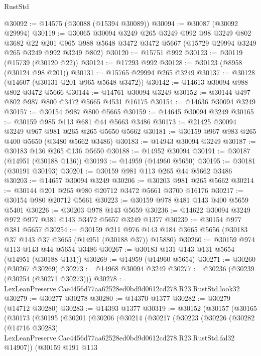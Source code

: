 \begin{lexlean}{RustStd}
\begin{coremodule}
@30092 := @14575 (@30088 (@15394 @30089))
@30094 := @30087 (@30092 @29994)
@30119 := @30065
    @30094
    @3249
    @265
    @3249
    @992
    @98
    @3249
    @802
    @3682
    @22
    @201
    @965
    @988
    @5648
    @3472
    @3472
    @5667
    (@15729 @29994 @3249 @265 @3249 @992 @3249 @802)
@30120 := @15751 @992
@30123 := @30119 (@15739 (@30120 @22))
@30124 := @17293 @992
@30128 := @30123 (@8958 (@30124 @98 @201))
@30131 := @15765 @29994 @265 @3249
@30137 := @30128 (@14607 (@30131 @201 @965 @5648 @3472))
@30142 := @14613 @30094 @988 @802 @3472 @5666
@30144 := @14761 @30094 @3249
@30152 := @30144 @497 @802 @987 @800 @3472 @5665 @4531 @16175
@30154 := @14636 @30094 @3249
@30157 := @30154 @987 @800 @5665
@30159 := @14645 @30094 @3249
@30165 := @30159 @985 @113 @681 @44 @5663 @3486
@30173 := @21425 @30094 @3249 @967 @981 @265 @265 @5650 @5662
@30181 := @30159 @967 @983 @265 @400 @5650 (@3480 @5662 @3486)
@30183 := @14943 @30094 @3249
@30187 := @30183 @136 @265 @136 @5650
@30188 := @14952 @30094
@30191 := @30187 (@14951 (@30188 @136))
@30193 := @14959 (@14960 @5650)
@30195 := @30181 (@30191 @30193)
@30201 := @30159 @981 @113 @265 @44 @5662 @3486
@30203 := @14657 @30094 @3249
@30206 := @30203 @981 @265 @5662
@30214 := @30144 @201 @265 @980 @20712 @3472 @5661 @3700 @16176
@30217 := @30154 @980 @20712 @5661
@30223 := @30159 @978 @481 @143 @400 @5659 @5401
@30226 := @30203 @978 @143 @5659
@30236 := @14622 @30094 @3249 @972 @977 @381 @143 @3472 @5657 @3249 @1377
@30239 := @30154 @977 @381 @5657
@30254 := @30159
    @211
    @976
    @143
    @184
    @3665
    @5656
    (@30183 @37 @143 @37 @3665 (@14951 (@30188 @37)) @15880)
@30260 := @30159 @974 @113 @143 @44 @5654 @3486
@30267 := @30183 @131 @143 @131 @5654 (@14951 (@30188 @131))
@30269 := @14959 (@14960 @5654)
@30271 := @30260 (@30267 @30269)
@30273 := @14968 @30094 @3249
@30277 := @30236 (@30239 (@30254 (@30271 @30273)))
@30278 := LexLeanPreserve.Cae4456d77aa62528ed0bd9d0612cd278.R23.RustStd.look32
@30279 := @30277 @30278
@30280 := @14370 @1377
@30282 := @30279 (@14712 @30280)
@30283 := @14393 @1377
@30319 := @30152
    (@30157
      (@30165
        (@30173
          (@30195
            (@30201
              (@30206
                (@30214
                  (@30217
                    (@30223
                      (@30226
                        (@30282
                          (@14716 @30283)
                          LexLeanPreserve.Cae4456d77aa62528ed0bd9d0612cd278.R23.RustStd.fal32
                          @14907))
                      (@30159
                        @191
                        @113

\end{coremodule}
\end{lexlean}
